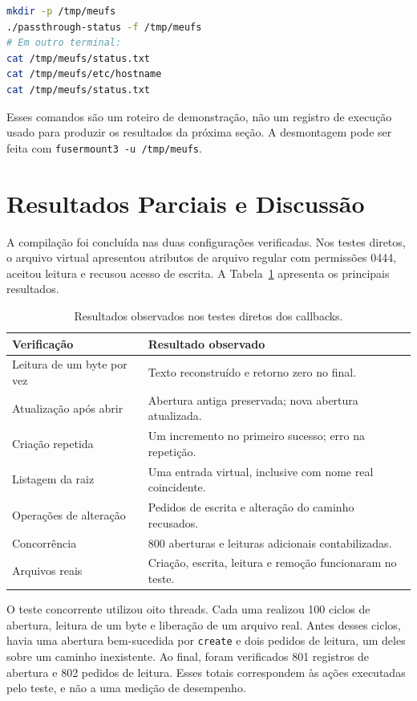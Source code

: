 \documentclass[12pt]{article}
\begin{document}
\begin{lstlisting}[language=bash]
mkdir -p /tmp/meufs
./passthrough-status -f /tmp/meufs
# Em outro terminal:
cat /tmp/meufs/status.txt
cat /tmp/meufs/etc/hostname
cat /tmp/meufs/status.txt
\end{lstlisting}

Esses comandos são um roteiro de demonstração, não um registro de
execução usado para produzir os resultados da próxima seção.
A desmontagem pode ser feita com \texttt{fusermount3 -u /tmp/meufs}.

\section{Resultados Parciais e Discussão}

A compilação foi concluída nas duas configurações verificadas.
Nos testes diretos, o arquivo virtual apresentou atributos de arquivo
regular com permissões 0444, aceitou leitura e recusou acesso de
escrita. A Tabela~\ref{tab:testes} apresenta os principais resultados.

\begin{table}[ht]
\centering
\caption{Resultados observados nos testes diretos dos callbacks.}
\label{tab:testes}
\begin{tabular}{p{}p{}}
\hline
Verificação & Resultado observado \\
\hline
Leitura de um byte por vez & Texto reconstruído e retorno zero no final. \\
Atualização após abrir & Abertura antiga preservada; nova abertura atualizada. \\
Criação repetida & Um incremento no primeiro sucesso; erro na repetição. \\
Listagem da raiz & Uma entrada virtual, inclusive com nome real coincidente. \\
Operações de alteração & Pedidos de escrita e alteração do caminho recusados. \\
Concorrência & 800 aberturas e leituras adicionais contabilizadas. \\
Arquivos reais & Criação, escrita, leitura e remoção funcionaram no teste. \\
\hline
\end{tabular}
\end{table}

O teste concorrente utilizou oito threads. Cada uma realizou
100 ciclos de abertura, leitura de um byte e liberação de um arquivo
real. Antes desses ciclos, havia uma abertura bem-sucedida por
\texttt{create} e dois pedidos de leitura, um deles sobre um caminho
inexistente. Ao final, foram verificados 801 registros de abertura
e 802 pedidos de leitura. Esses totais correspondem às ações
executadas pelo teste, e não a uma medição de desempenho.
\end{document}

